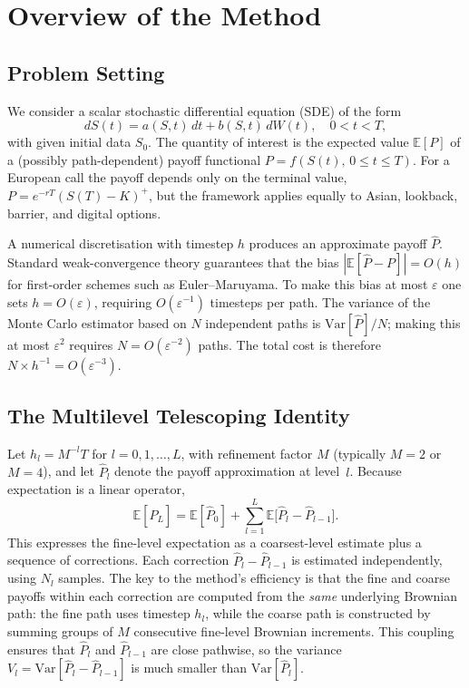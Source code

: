 \documentclass[11pt]{article}
\begin{document}
\section{Overview of the Method}

\subsection{Problem Setting}

We consider a scalar stochastic differential equation (SDE) of the form
\begin{equation}
dS(t) = a(S,t)\,dt + b(S,t)\,dW(t), \quad 0 < t < T,
\label{eq:sde}
\end{equation}
with given initial data $S_0$. The quantity of interest is the expected value $\mathbb{E}[P]$ of a (possibly path-dependent) payoff functional $P = f(S(t),\, 0 \le t \le T)$. For a European call the payoff depends only on the terminal value, $P = e^{-rT}(S(T) - K)^{+}$, but the framework applies equally to Asian, lookback, barrier, and digital options.

A numerical discretisation with timestep $h$ produces an approximate payoff $\hat{P}$. Standard weak-convergence theory guarantees that the bias $|\mathbb{E}[\hat{P} - P]| = O(h)$ for first-order schemes such as Euler--Maruyama. To make this bias at most $\varepsilon$ one sets $h = O(\varepsilon)$, requiring $O(\varepsilon^{-1})$ timesteps per path. The variance of the Monte Carlo estimator based on $N$ independent paths is $\mathrm{Var}[\hat{P}]/N$; making this at most $\varepsilon^{2}$ requires $N = O(\varepsilon^{-2})$ paths. The total cost is therefore $N \times h^{-1} = O(\varepsilon^{-3})$.

\subsection{The Multilevel Telescoping Identity}

Let $h_{l} = M^{-l}T$ for $l = 0, 1, \ldots, L$, with refinement factor $M$ (typically $M = 2$ or $M = 4$), and let $\hat{P}_{l}$ denote the payoff approximation at level~$l$. Because expectation is a linear operator,
\begin{equation}
\mathbb{E}[\hat{P}_{L}]
= \mathbb{E}[\hat{P}_{0}]
+ \sum_{l=1}^{L}\mathbb{E}\!\bigl[\hat{P}_{l} - \hat{P}_{l-1}\bigr].
\label{eq:telescoping}
\end{equation}
This expresses the fine-level expectation as a coarsest-level estimate plus a sequence of corrections. Each correction $\hat{P}_{l} - \hat{P}_{l-1}$ is estimated independently, using $N_{l}$ samples. The key to the method's efficiency is that the fine and coarse payoffs within each correction are computed from the \emph{same} underlying Brownian path: the fine path uses timestep $h_{l}$, while the coarse path is constructed by summing groups of $M$ consecutive fine-level Brownian increments. This coupling ensures that $\hat{P}_{l}$ and $\hat{P}_{l-1}$ are close pathwise, so the variance $V_{l} = \mathrm{Var}[\hat{P}_{l} - \hat{P}_{l-1}]$ is much smaller than $\mathrm{Var}[\hat{P}_{l}]$.
\end{document}

